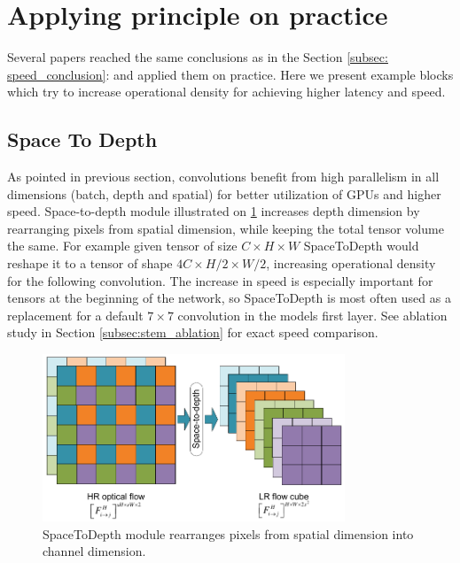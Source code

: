 \section{Applying principle on practice}
Several papers reached the same conclusions as in the Section \ref{subsec: speed_conclusion}: \cite{li2021_searching} \cite{lin2020neural_genet} and applied them on practice. Here we present example blocks which try to increase operational density for achieving higher latency and speed. 


\subsection{Space To Depth} \label{subsec:space2depth}

As pointed in previous section, convolutions benefit from high parallelism in all dimensions (batch, depth and spatial) for better utilization of GPUs and higher speed. Space-to-depth module \cite{ridnik2021_tresnet} \cite{li2021_searching} illustrated on \ref{fig:space2depth} increases depth dimension by rearranging pixels from spatial dimension, while keeping the total tensor volume the same. For example given tensor of size $C \times H \times W$ SpaceToDepth would reshape it to a tensor of shape $4 C \times H / 2 \times W /2$, increasing operational density for the following convolution. The increase in speed is especially important for tensors at the beginning of the network, so SpaceToDepth is most often used as a replacement for a default $7 \times 7$ convolution in the models first layer. See ablation study in Section \ref{subsec:stem_ablation} for exact speed comparison.


\begin{figure}[h!]
    \centering
        \includegraphics[clip, trim=0cm 1.4cm 0cm 0cm, height=5cm]{images/space2depth.pdf}
    \caption{SpaceToDepth module rearranges pixels from spatial dimension into channel dimension.} 
    \label{fig:space2depth}
    \end{figure}




